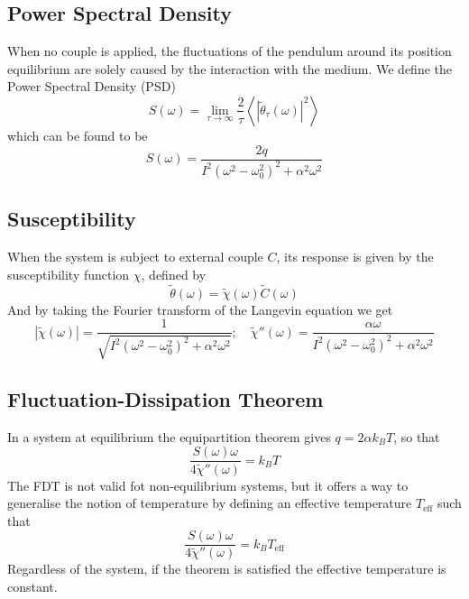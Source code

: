 \subsection{Power Spectral Density}
When no couple is applied, the fluctuations of the pendulum around its position equilibrium are solely caused by the interaction with the medium. We define the Power Spectral Density (PSD)
\begin{equation}
    S(\omega) = \lim_{\tau \rightarrow \infty} \frac{2}{\tau} \left\langle \left| \tilde{\theta}_\tau (\omega) \right|^2 \right\rangle
\end{equation}
which can be found to be
\begin{equation}
    S(\omega) = \frac{2q}{I^2(\omega^2 - \omega_0^2)^2 + \alpha^2 \omega^2}
\end{equation}

\subsection{Susceptibility}
When the system is subject to external couple $C$, its response is given by the susceptibility function $\chi$, defined by
\begin{equation}
    \tilde{\theta} (\omega) = \tilde{\chi}(\omega) \tilde{C}(\omega)
\end{equation}
And by taking the Fourier transform of the Langevin equation we get
\begin{equation}
    \left|\tilde{\chi} (\omega)\right| = \frac{1}{\sqrt{I^2 ( \omega^2 - \omega^2_0)^2 + \alpha^2 \omega^2}};\quad \tilde{\chi}'' (\omega) = \frac{\alpha \omega}{I^2 (\omega^2 - \omega_0^2)^2 + \alpha^2 \omega^2}
\end{equation}

\subsection{Fluctuation-Dissipation Theorem}
In a system at equilibrium the equipartition theorem gives $q = 2 \alpha k_B T$, so that
\begin{equation}
    \frac{S(\omega) \omega}{4 \tilde{\chi}'' (\omega)} = k_B T
\end{equation}
The FDT is not valid fot non-equilibrium systems, but it offers a way to generalise the notion of temperature by defining an effective temperature $T_{\text{eff}}$ such that
\begin{equation}
    \frac{S(\omega) \omega}{4 \tilde{\chi}'' (\omega)} = k_B T_{\text{eff}}
\end{equation}
Regardless of the system, if the theorem is satisfied the effective temperature is constant.
